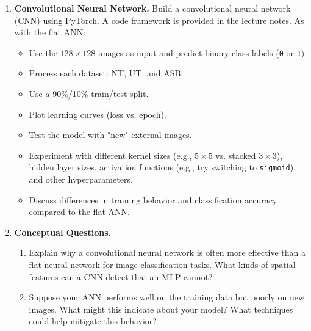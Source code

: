 \documentclass[12pt]{article}
\begin{document}
\begin{enumerate}
\item \textbf{Convolutional Neural Network.}  
Build a convolutional neural network (CNN) using PyTorch. A code framework is provided in the lecture notes. As with the flat ANN:
\begin{itemize}
    \item Use the $128 \times 128$ images as input and predict binary class labels (\texttt{0} or \texttt{1}).
    \item Process each dataset: NT, UT, and ASB.
    \item Use a 90\%/10\% train/test split.
    \item Plot learning curves (loss vs. epoch).
    \item Test the model with "new" external images.
    \item Experiment with different kernel sizes (e.g., $5\times5$ vs. stacked $3\times3$), hidden layer sizes, activation functions (e.g., try switching to \texttt{sigmoid}), and other hyperparameters.
    \item Discuss differences in training behavior and classification accuracy compared to the flat ANN.
\end{itemize}

\item \textbf{Conceptual Questions.}
\begin{enumerate}
    \item Explain why a convolutional neural network is often more effective than a flat neural network for image classification tasks. What kinds of spatial features can a CNN detect that an MLP cannot?
    \item Suppose your ANN performs well on the training data but poorly on new images. What might this indicate about your model? What techniques could help mitigate this behavior?
\end{enumerate}

\end{enumerate}
\end{document}

